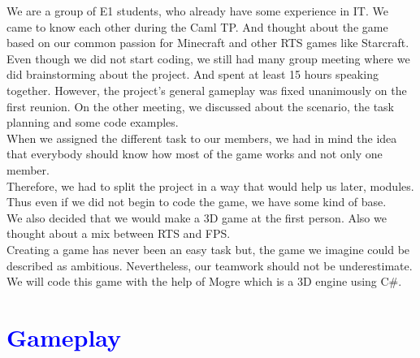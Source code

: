 \documentclass[article]{report} %
\begin{document}
					We are a group of E1 students, who  already have some experience in IT. We came to know each other during the Caml TP. And thought about the game based on our common passion for Minecraft and other \ac{RTS} games like Starcraft.\\

					Even though we did not start coding, we still had many group meeting where we did brainstorming about the project. And spent at least 15 hours speaking together.\newline
					However, the project's general gameplay was fixed unanimously on the first reunion. On the other meeting, we discussed about the scenario, the task planning and some code examples.\\
								
					When we assigned the different task to our members, we had in mind the idea that everybody should know how most of the game works and not only one member.\\
					 Therefore, we had to split the project in a way that would help us later, modules. Thus even if we did not begin to code the game, we have some kind of base.\\

					 We also decided that we would make a 3D game at the first person. Also we thought about a mix between \ac{RTS} and \ac{FPS}. \\ 						Creating a game has never been an easy task but, the game we imagine could be described as ambitious. Nevertheless, our teamwork should not be underestimate.\\
					We will code this game with the help of \ac{Mogre} which is a 3D engine using C\#.  
 								
								
  			\chapter{\textcolor{blue}{Gameplay}}
\end{document}
